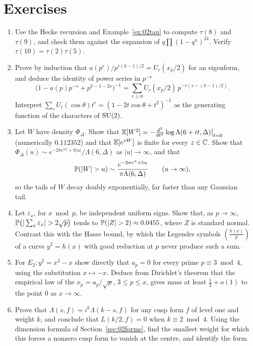 \section{Exercises}

\begin{enumerate}
\item Use the Hecke recursion and Example~\ref{ex:02tau} to compute $\tau(8)$ and $\tau(9)$, and check them against the expansion of $q\prod(1-q^n)^{24}$. Verify $\tau(10)=\tau(2)\tau(5)$.
\item Prove by induction that $a(p^r)/p^{r(k-1)/2}=U_r(x_p/2)$ for an eigenform, and deduce the identity of power series in $p^{-s}$
\[
\bigl(1-a(p)p^{-s}+p^{k-1-2s}\bigr)^{-1}=\sum_{r\ge0}U_r(x_p/2)\,p^{-r(s-(k-1)/2)}.
\]
Interpret $\sum_rU_r(\cos\theta)t^r=(1-2t\cos\theta+t^2)^{-1}$ as the generating function of the characters of $\mathrm{SU}(2)$.
\item Let $W$ have density $\Phi_\Delta$. Show that $\mathbb{E}[W^2]=-\frac{d^2}{dt^2}\log\Lambda(6+it,\Delta)\big|_{t=0}$ (numerically $0.112352$) and that $\mathbb{E}[e^{zW}]$ is finite for every $z\in\mathbb{C}$. Show that $\Phi_\Delta(u)\sim e^{-2\pi e^{|u|}+6|u|}/\Lambda(6,\Delta)$ as $|u|\to\infty$, and that
\[
\Prob(|W|>u)\sim\frac{e^{-2\pi e^u+5u}}{\pi\Lambda(6,\Delta)}\qquad(u\to\infty),
\]
so the tails of $W$ decay doubly exponentially, far faster than any Gaussian tail.
\item\label{exr:02signs} Let $\varepsilon_x$, for $x\bmod p$, be independent uniform signs. Show that, as $p\to\infty$, $\Prob\bigl(|\sum_x\varepsilon_x|>2\sqrt p\bigr)$ tends to $\Prob(|Z|>2)\approx0.0455$, where $Z$ is standard normal. Contrast this with the Hasse bound, by which the Legendre symbols $\left(\frac{h(x)}p\right)$ of a curve $y^2=h(x)$ with good reduction at $p$ never produce such a sum.
\item For $E_2:y^2=x^3-x$ show directly that $a_p=0$ for every prime $p\equiv3\bmod4$, using the substitution $x\mapsto-x$. Deduce from Dirichlet's theorem that the empirical law of the $x_p=a_p/\sqrt p$, $3\le p\le x$, gives mass at least $\frac12+o(1)$ to the point $0$ as $x\to\infty$.
\item\label{exr:02fe} Prove that $\Lambda(s,f)=i^k\Lambda(k-s,f)$ for any cusp form $f$ of level one and weight $k$, and conclude that $L(k/2,f)=0$ when $k\equiv2\bmod4$. Using the dimension formula of Section~\ref{sec:02forms}, find the smallest weight for which this forces a nonzero cusp form to vanish at the centre, and identify the form.
\end{enumerate}

